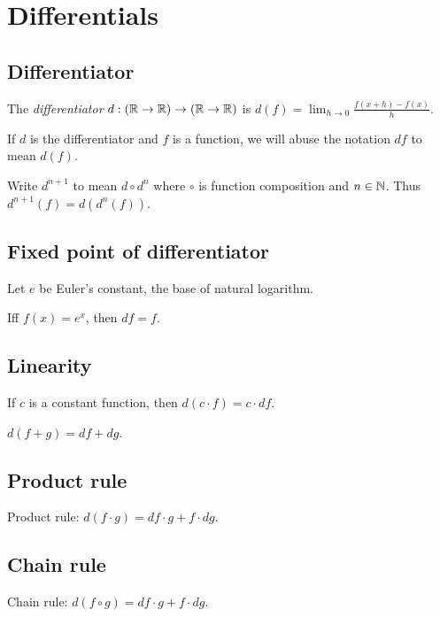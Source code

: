 \chapter{Differentials}

\section{Differentiator}

%
The \emph{differentiator}
\(d : (\mathbb{R} \to \mathbb{R}) \to (\mathbb{R} \to \mathbb{R})\)
is \(d(f) = \lim_{h\to 0} \frac{f(x+h)-f(x)}{h}\).

If \(d\) is the differentiator and \(f\) is a function,
we will abuse the notation \(df\) to mean \(d(f)\).

Write \(d^{n+1}\) to mean \(d \circ d^n\)
where \(\circ\) is function composition
and \(n \in \mathbb{N}\).
Thus \(d^{n+1}(f) = d(d^n(f))\).

\section{Fixed point of differentiator}

Let \(e\) be
%
%
Euler's constant, the base of natural logarithm.

%
Iff \(f(x) = e^x\), then \(df = f\).

\section{Linearity}

%
If \(c\) is a constant function, then \(d(c \cdot f) = c \cdot df\).

\(d(f+g) = df + dg\).

\section{Product rule}

%
%
Product rule: \(d(f \cdot g) = df \cdot g + f \cdot dg\).

\section{Chain rule}

%
%
Chain rule: \(d(f \circ g) = df \cdot g + f \cdot dg\).

